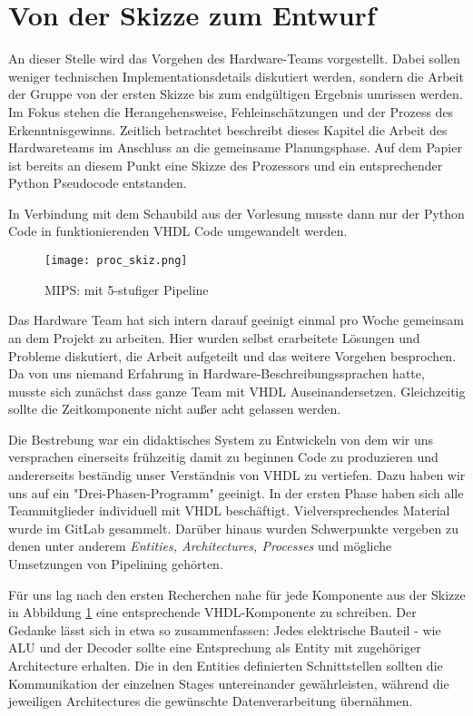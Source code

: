 \documentclass[paper=a4,fontsize=11pt,twocolumn]{scrreprt}
\begin{document}
\section{Von der Skizze zum Entwurf}
\label{sec:von_der_skizze_zum_entwurf}

An dieser Stelle wird das Vorgehen des Hardware-Teams vorgestellt.
Dabei sollen weniger technischen Implementationsdetails diskutiert werden, sondern die Arbeit der Gruppe von der ersten Skizze bis zum endgültigen Ergebnis umrissen werden.
Im Fokus stehen die Herangehensweise, Fehleinschätzungen und der Prozess des Erkenntnisgewinns.
Zeitlich betrachtet beschreibt dieses Kapitel die Arbeit des Hardwareteams im Anschluss an die gemeinsame Planungsphase.
Auf dem Papier ist bereits an diesem Punkt eine Skizze des Prozessors und ein entsprechender Python Pseudocode entstanden\cite{gitlab_projekt}.

In Verbindung mit dem Schaubild aus der Vorlesung \textcite[]{rsvorlesung} musste dann nur der Python Code in funktionierenden VHDL Code umgewandelt werden.

\begin{figure}
    \centering
    \texttt{[image: proc\_skiz.png]}
    \caption{MIPS: mit 5-stufiger Pipeline}
    \label{fig:proc_skiz}
\end{figure}

Das Hardware Team hat sich intern darauf geeinigt einmal pro Woche gemeinsam an dem Projekt zu arbeiten. 
Hier wurden selbst erarbeitete Lösungen und Probleme diskutiert, die Arbeit aufgeteilt und das weitere Vorgehen besprochen.
Da von uns niemand Erfahrung in Hardware-Beschreibungssprachen hatte, musste sich zunächst dass ganze Team mit VHDL Auseinandersetzen.
Gleichzeitig sollte die Zeitkomponente nicht außer acht gelassen werden.

Die Bestrebung war ein didaktisches System zu Entwickeln von dem wir uns versprachen einerseits frühzeitig damit zu beginnen Code zu produzieren und andererseits beständig unser Verständnis von VHDL zu vertiefen.
Dazu haben wir uns auf ein "Drei-Phasen-Programm" geeinigt. In der ersten Phase haben sich alle Teammitglieder individuell mit VHDL beschäftigt.
Vielversprechendes Material wurde im GitLab gesammelt.
Darüber hinaus wurden Schwerpunkte vergeben zu denen unter anderem \textit{Entities, Architectures, Processes} und mögliche Umsetzungen von Pipelining gehörten.

Für uns lag nach den ersten Recherchen nahe für jede Komponente aus der Skizze in Abbildung \ref{fig:proc_skiz} eine entsprechende VHDL-Komponente zu schreiben.
Der Gedanke lässt sich in etwa so zusammenfassen: Jedes elektrische Bauteil - wie ALU und der Decoder sollte eine Entsprechung als Entity mit zugehöriger Architecture erhalten.
Die in den Entities definierten Schnittstellen sollten die Kommunikation der einzelnen Stages untereinander gewährleisten, während die jeweiligen Architectures die gewünschte Datenverarbeitung übernähmen.
\end{document}
